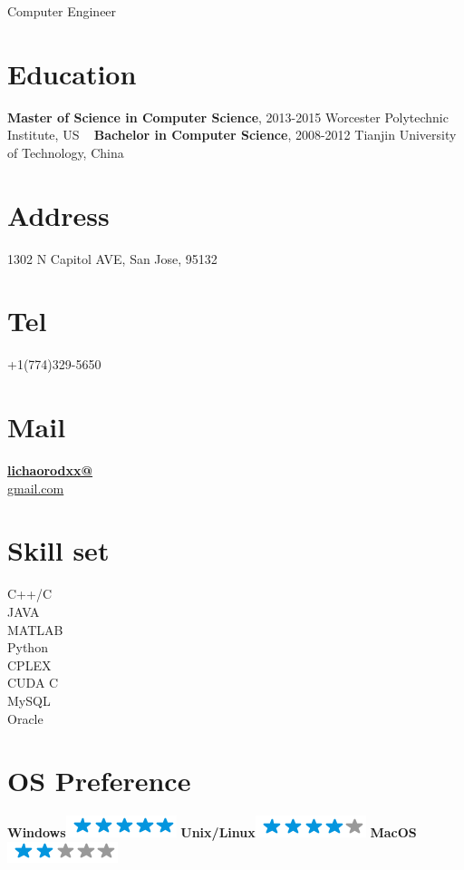 \documentclass[]{friggeri-cv}
\begin{document}
{Computer Engineer}


\begin{aside}
	\section{Education}
	\textbf{Master of Science in 
	Computer Science}, 
	2013-2015
	Worcester Polytechnic 
	Institute, US
	~
	\textbf{Bachelor in 
	Computer Science}, 
	2008-2012
	Tianjin University of 
	Technology, China
	\section{Address}
	1302 N Capitol AVE, 
	San Jose, 95132
	\section{Tel}
	+1(774)329-5650
	\section{Mail}
	\href{mailto:lichaorodxx@gmail.com}{\textbf{lichaorodxx@}\\gmail.com}
	~
	\section{Skill set}
	C++/C\\JAVA\\MATLAB\\Python\\CPLEX\\CUDA C\\MySQL\\Oracle
	\section{OS Preference}
	\textbf{Windows}\includegraphics[scale=0.40]{img/5stars.png}
	\textbf{Unix/Linux}\includegraphics[scale=0.40]{img/4stars.png}
	\textbf{MacOS}\includegraphics[scale=0.40]{img/2stars.png}
	~

\end{aside}
\end{document}
